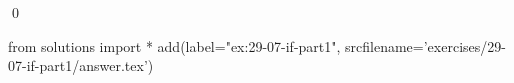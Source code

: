 
\begin{ex}
  \label{ex:29-07-if-part1}
  
  \qed
\end{ex}
\begin{python0}
from solutions import *
add(label="ex:29-07-if-part1",
    srcfilename='exercises/29-07-if-part1/answer.tex')
\end{python0}
